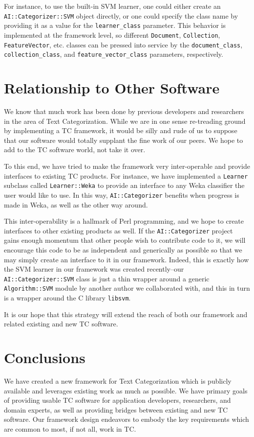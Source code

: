 \documentclass[a4paper,twocolumn]{article}
\begin{document}
For instance, to use the built-in SVM learner, one could either create an \texttt{AI::Categorizer::SVM} object directly, or one could specify the class name by providing it as a value for the \texttt{learner\_class} parameter.  This behavior is implemented at the framework level, so different \texttt{Document}, \texttt{Collection}, \texttt{FeatureVector}, etc. classes can be pressed into service by the \texttt{document\_class}, \texttt{collection\_class}, and \texttt{feature\_vector\_class} parameters, respectively.


\section{Relationship to Other Software}

We know that much work has been done by previous developers and researchers in the area of Text Categorization.  While we are in one sense re-treading ground by implementing a TC framework, it would be silly and rude of us to suppose that our software would totally supplant the fine work of our peers.  We hope to add to the TC software world, not take it over.

To this end, we have tried to make the framework very inter-operable and provide interfaces to existing TC products.  For instance, we have implemented a \texttt{Learner} subclass called \texttt{Learner::Weka} to provide an interface to any Weka classifier the user would like to use.  In this way, \texttt{AI::Categorizer} benefits when progress is made in Weka, as well as the other way around.

This inter-operability is a hallmark of Perl programming, and we hope to create interfaces to other existing products as well.  If the \texttt{AI::Categorizer} project gains enough momentum that other people wish to contribute code to it, we will encourage this code to be as independent and generically as possible so that we may simply create an interface to it in our framework.  Indeed, this is exactly how the SVM learner in our framework was created recently--our \texttt{AI::Categorizer::SVM} class is just a thin wrapper around a generic \texttt{Algorithm::SVM} module by another author we collaborated with, and this in turn is a wrapper around the C library \texttt{libsvm}.

It is our hope that this strategy will extend the reach of both our framework and related existing and new TC software.

\section{Conclusions}

We have created a new framework for Text Categorization which is publicly available and leverages existing work as much as possible.  We have primary goals of providing usable TC software for application developers, researchers, and domain experts, as well as providing bridges between existing and new TC software.  Our framework design endeavors to embody the key requirements which are common to most, if not all, work in TC.




\end{document}
